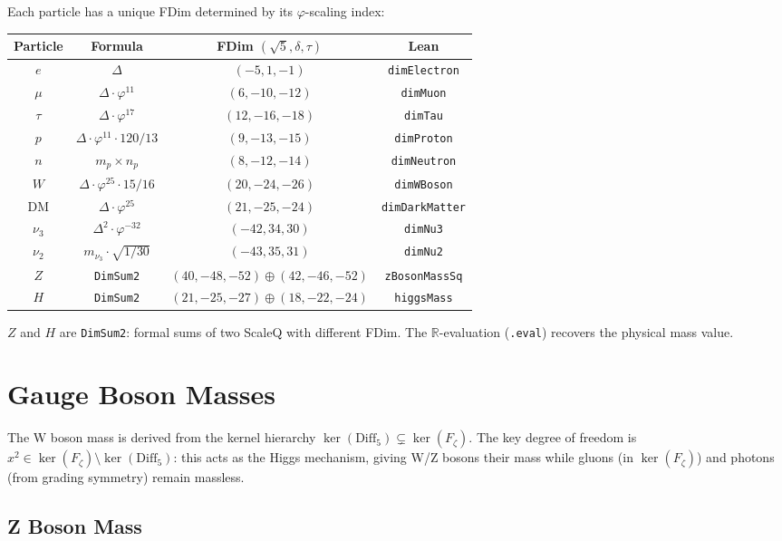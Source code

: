 Each particle has a unique FDim determined by its $\varphi$-scaling index:
\begin{center}
\begin{tabular}{|c|c|c|c|}
\hline
Particle & Formula & FDim $(\sqrt{5}, \delta, \tau)$ & Lean \\
\hline
$e$ & $\Delta$ & $(-5,1,-1)$ & \texttt{dimElectron} \\
$\mu$ & $\Delta \cdot \varphi^{11}$ & $(6,-10,-12)$ & \texttt{dimMuon} \\
$\tau$ & $\Delta \cdot \varphi^{17}$ & $(12,-16,-18)$ & \texttt{dimTau} \\
$p$ & $\Delta \cdot \varphi^{11} \cdot 120/13$ & $(9,-13,-15)$ & \texttt{dimProton} \\
$n$ & $m_p \times n_p$ & $(8,-12,-14)$ & \texttt{dimNeutron} \\
$W$ & $\Delta \cdot \varphi^{25} \cdot 15/16$ & $(20,-24,-26)$ & \texttt{dimWBoson} \\
DM & $\Delta \cdot \varphi^{25}$ & $(21,-25,-24)$ & \texttt{dimDarkMatter} \\
$\nu_3$ & $\Delta^2 \cdot \varphi^{-32}$ & $(-42,34,30)$ & \texttt{dimNu3} \\
$\nu_2$ & $m_{\nu_3} \cdot \sqrt{1/30}$ & $(-43,35,31)$ & \texttt{dimNu2} \\
\hline
$Z$ & \texttt{DimSum2} & $(40,-48,-52) \oplus (42,-46,-52)$ & \texttt{zBosonMassSq} \\
$H$ & \texttt{DimSum2} & $(21,-25,-27) \oplus (18,-22,-24)$ & \texttt{higgsMass} \\
\hline
\end{tabular}
\end{center}
$Z$ and $H$ are \texttt{DimSum2}: formal sums of two ScaleQ with different FDim.
The $\mathbb{R}$-evaluation (\texttt{.eval}) recovers the physical mass value.

\section{Gauge Boson Masses}
\label{sec:mass_gauge_bosons}

The W boson mass is derived from the kernel hierarchy $\ker(\mathrm{Diff}_5) \subsetneq \ker(F_\zeta)$.
The key degree of freedom is $x^2 \in \ker(F_\zeta) \setminus \ker(\mathrm{Diff}_5)$: this acts as the Higgs mechanism,
giving W/Z bosons their mass while gluons (in $\ker(F_\zeta)$) and photons (from grading symmetry) remain massless.

\subsection{Z Boson Mass}

